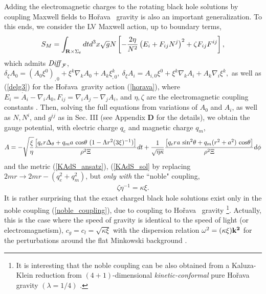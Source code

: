 \documentclass[preprint,aps,tightenlines,showkeys,nofootinbib,superscriptaddress]{revtex4}
\newcommand{\beq}{\begin{eqnarray}}
\newcommand{\eeq}{\end{eqnarray}}
\newcommand{\de}{{\delta}}
\newcommand{\De}{\Delta}
\newcommand{\ka}{\kappa}
\newcommand{\la}{{\lambda}}
\newcommand{\La}{{\Lambda}}
\newcommand{\Si}{{\Sigma}}
\newcommand{\om}{{\omega}}
\newcommand{\no}{{\nonumber}}
\newcommand{\f}{\frac}
\newcommand{\ra}{\rightarrow}
\newcommand{\Ho}{Ho\v{r}ava}
\newcommand{\DiffF}{${\it Diff}_{\cal F}$}
\begin{document}
Adding the electromagnetic charges to the rotating black hole solutions by coupling Maxwell fields to \Ho~ gravity is also an important generalization. To this ends, we consider the LV Maxwell action, up to boundary terms,
\beq
S_M=\int_{{\bf R} \times \Si_t} dt d^3 x \sqrt{g} N \left[ -\f{2 \eta}{N^2} \left(E_i +F_{ij}N^j \right)^2+\zeta F_{ij} F^{ij}\right],
\eeq
which admits \DiffF,~
$
\de_{\xi} A_0 =(A_0 \xi^0)_{,0}+\xi^k \nabla_k A_0+A_k \xi^k_{,0},
~\de_{\xi} A_i =A_{i,0}\xi^0+\xi^k \nabla_k A_i+A_k \nabla_i\xi^k,
$
as well as (\ref{delg3}) for the \Ho~gravity action (\ref{horava}),
where $E_i=\dot{A}_i -\nabla_i A_0, F_{ij}=\nabla_i A_j-\nabla_j A_i$,
and $\eta, \zeta$ are the electromagnetic coupling constants
\cite{Suda:1992,Kiri:2009,Lin:2014}.
Then, solving the full equations from variations of $A_0$ and $A_i$, as well as $N, N^i$, and $g^{ij}$ as in Sec. III (see Appendix {\bf D} for the details), we obtain the gauge potential, with electric charge $q_e$ and magnetic charge $q_m$,
\beq
A=-\sqrt{\f{\xi}{\eta}} \f{\left[ q_e r \De_\theta + q_m a ~\mbox{cos}\theta~ (1-\La r^2 (3 \xi)^{-1})\right]}{\rho^2 \Xi} dt+ \f{1}{\sqrt{\eta \ka}} \f{\left[q_e r {\it a}~ \mbox{sin}^2\theta+q_m (r^2+a^2)~ \mbox{cos}\theta \right]}{\rho^2 \Xi} d \phi
\label{A_sol}
\no \\
\eeq
and the metric (\ref{KAdS_ansatz}), (\ref{KAdS_sol} by replacing $2mr\ra2mr-(q_e^2+q_m^2)$, but {\it only with} the ``noble"
coupling,
\beq
\zeta \eta^{-1}=\ka \xi.
\label{noble_coupling}
\eeq
It is rather surprising that the exact charged black hole solutions exist only in the noble coupling (\ref{noble_coupling}), due to coupling to \Ho~ gravity \footnote{It is interesting that the noble coupling can be also obtained from a Kaluza-Klein reduction from $(4+1)$-dimensional {\it kinetic-conformal} pure \Ho~ gravity $(\la=1/4)$ \cite{Rest:2019}.}. Actually, this is the case where the speed of gravity is identical to the speed of light (or electromagnetism), $c_g=c_l=\sqrt{\ka \xi}$ with the dispersion relation $\om^2= (\ka \xi) \bf{k}^2$ for the perturbations around the flat Minkowski background \cite{Park:2009}.
\end{document}
